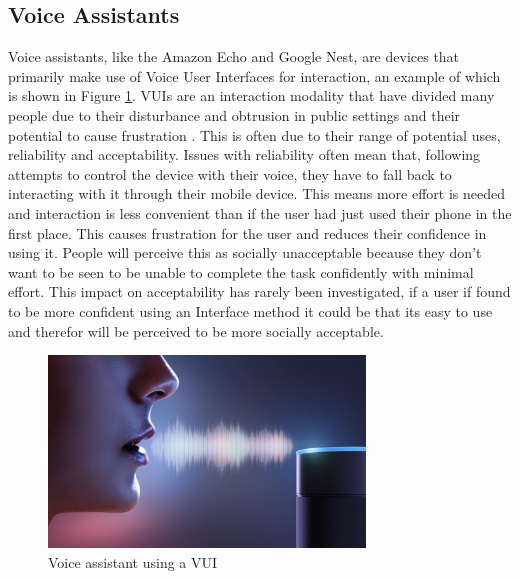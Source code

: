 \documentclass{l4proj}
\begin{document}
\subsection{Voice Assistants}


Voice assistants, like the Amazon Echo and Google Nest, are devices that primarily make use of Voice User Interfaces for interaction, an example of which is shown in Figure \ref{fig:VUI}. VUIs are an interaction modality that have divided many people due to their disturbance and obtrusion in public settings \citep{lee_interaction_2018} and their potential to cause frustration \citep{myers_patterns_2018}. This is often due to their range of potential uses, reliability and acceptability. Issues with reliability often mean that, following attempts to control the device with their voice, they have to fall back to interacting with it through their mobile device. This means more effort is needed and interaction is less convenient than if the user had just used their phone in the first place. This causes frustration for the user and reduces their confidence in using it. People will perceive this as socially unacceptable because they don't want to be seen to be unable to complete the task confidently with minimal effort. This impact on acceptability has rarely been investigated, if a user if found to be more confident using an Interface method it could be that its easy to use and therefor will be perceived to be more socially acceptable.

\begin{figure}[!htb]
    \centering
    \includegraphics[width=0.75\textwidth]{images/VUI.jpg}
        \caption{Voice assistant using a VUI}
        \label{fig:VUI}
\end{figure}
\end{document}
